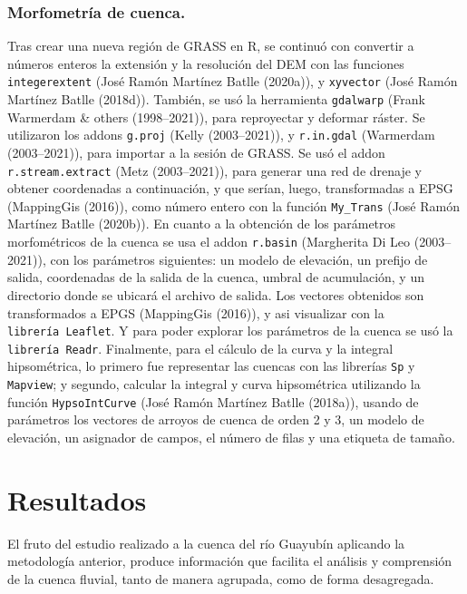\documentclass[11pt,]{article}
\begin{document}
\subsubsection{Morfometría de cuenca.}\label{morfometruxeda-de-cuenca.}

Tras crear una nueva región de GRASS en R, se continuó con convertir a
números enteros la extensión y la resolución del DEM con las funciones
\texttt{integerextent} (José Ramón Martínez Batlle (2020a)), y
\texttt{xyvector} (José Ramón Martínez Batlle (2018d)). También, se usó
la herramienta \texttt{gdalwarp} (Frank Warmerdam \& others
(1998--2021)), para reproyectar y deformar ráster. Se utilizaron los
addons \texttt{g.proj} (Kelly (2003--2021)), y \texttt{r.in.gdal}
(Warmerdam (2003--2021)), para importar a la sesión de GRASS. Se usó el
addon \texttt{r.stream.extract} (Metz (2003--2021)), para generar una
red de drenaje y obtener coordenadas a continuación, y que serían,
luego, transformadas a EPSG (MappingGis (2016)), como número entero con
la función \texttt{My\_Trans} (José Ramón Martínez Batlle (2020b)). En
cuanto a la obtención de los parámetros morfométricos de la cuenca se
usa el addon \texttt{r.basin} (Margherita Di Leo (2003--2021)), con los
parámetros siguientes: un modelo de elevación, un prefijo de salida,
coordenadas de la salida de la cuenca, umbral de acumulación, y un
directorio donde se ubicará el archivo de salida. Los vectores obtenidos
son transformados a EPGS (MappingGis (2016)), y asi visualizar con la
\texttt{librería\ Leaflet}. Y para poder explorar los parámetros de la
cuenca se usó la \texttt{librería\ Readr}. Finalmente, para el cálculo
de la curva y la integral hipsométrica, lo primero fue representar las
cuencas con las librerías \texttt{Sp} y \texttt{Mapview}; y segundo,
calcular la integral y curva hipsométrica utilizando la función
\texttt{HypsoIntCurve} (José Ramón Martínez Batlle (2018a)), usando de
parámetros los vectores de arroyos de cuenca de orden 2 y 3, un modelo
de elevación, un asignador de campos, el número de filas y una etiqueta
de tamaño.

\section{Resultados}\label{resultados}

El fruto del estudio realizado a la cuenca del río Guayubín aplicando la
metodología anterior, produce información que facilita el análisis y
comprensión de la cuenca fluvial, tanto de manera agrupada, como de
forma desagregada.
\end{document}
